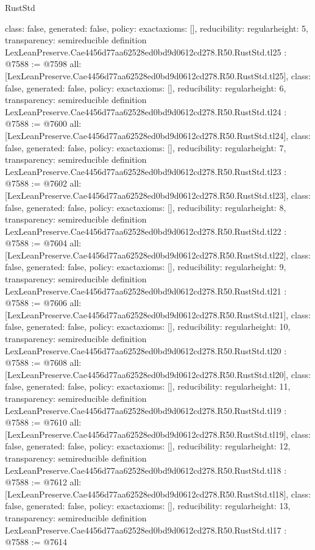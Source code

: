\begin{lexlean}{RustStd}
\begin{coremodule}
{  class: false,
  generated: false,
  policy: exact{axioms: []},
  reducibility: regular{height: 5},
  transparency: semireducible
}
definition LexLeanPreserve.Cae4456d77aa62528ed0bd9d0612cd278.R50.RustStd.tl25 : @7588 := @7598 {
  all: [LexLeanPreserve.Cae4456d77aa62528ed0bd9d0612cd278.R50.RustStd.tl25],
  class: false,
  generated: false,
  policy: exact{axioms: []},
  reducibility: regular{height: 6},
  transparency: semireducible
}
definition LexLeanPreserve.Cae4456d77aa62528ed0bd9d0612cd278.R50.RustStd.tl24 : @7588 := @7600 {
  all: [LexLeanPreserve.Cae4456d77aa62528ed0bd9d0612cd278.R50.RustStd.tl24],
  class: false,
  generated: false,
  policy: exact{axioms: []},
  reducibility: regular{height: 7},
  transparency: semireducible
}
definition LexLeanPreserve.Cae4456d77aa62528ed0bd9d0612cd278.R50.RustStd.tl23 : @7588 := @7602 {
  all: [LexLeanPreserve.Cae4456d77aa62528ed0bd9d0612cd278.R50.RustStd.tl23],
  class: false,
  generated: false,
  policy: exact{axioms: []},
  reducibility: regular{height: 8},
  transparency: semireducible
}
definition LexLeanPreserve.Cae4456d77aa62528ed0bd9d0612cd278.R50.RustStd.tl22 : @7588 := @7604 {
  all: [LexLeanPreserve.Cae4456d77aa62528ed0bd9d0612cd278.R50.RustStd.tl22],
  class: false,
  generated: false,
  policy: exact{axioms: []},
  reducibility: regular{height: 9},
  transparency: semireducible
}
definition LexLeanPreserve.Cae4456d77aa62528ed0bd9d0612cd278.R50.RustStd.tl21 : @7588 := @7606 {
  all: [LexLeanPreserve.Cae4456d77aa62528ed0bd9d0612cd278.R50.RustStd.tl21],
  class: false,
  generated: false,
  policy: exact{axioms: []},
  reducibility: regular{height: 10},
  transparency: semireducible
}
definition LexLeanPreserve.Cae4456d77aa62528ed0bd9d0612cd278.R50.RustStd.tl20 : @7588 := @7608 {
  all: [LexLeanPreserve.Cae4456d77aa62528ed0bd9d0612cd278.R50.RustStd.tl20],
  class: false,
  generated: false,
  policy: exact{axioms: []},
  reducibility: regular{height: 11},
  transparency: semireducible
}
definition LexLeanPreserve.Cae4456d77aa62528ed0bd9d0612cd278.R50.RustStd.tl19 : @7588 := @7610 {
  all: [LexLeanPreserve.Cae4456d77aa62528ed0bd9d0612cd278.R50.RustStd.tl19],
  class: false,
  generated: false,
  policy: exact{axioms: []},
  reducibility: regular{height: 12},
  transparency: semireducible
}
definition LexLeanPreserve.Cae4456d77aa62528ed0bd9d0612cd278.R50.RustStd.tl18 : @7588 := @7612 {
  all: [LexLeanPreserve.Cae4456d77aa62528ed0bd9d0612cd278.R50.RustStd.tl18],
  class: false,
  generated: false,
  policy: exact{axioms: []},
  reducibility: regular{height: 13},
  transparency: semireducible
}
definition LexLeanPreserve.Cae4456d77aa62528ed0bd9d0612cd278.R50.RustStd.tl17 : @7588 := @7614 {
}
\end{coremodule}
\end{lexlean}

